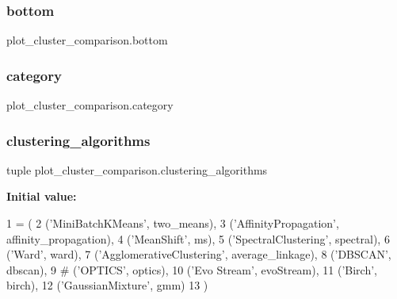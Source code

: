 \subsubsection{\texorpdfstring{bottom}{bottom}}
{\footnotesize\ttfamily plot\+\_\+cluster\+\_\+comparison.\+bottom}

\mbox{\label{namespaceplot__cluster__comparison_ab41605764644eb78915c2ce8dbc4bd89}} 
\subsubsection{\texorpdfstring{category}{category}}
{\footnotesize\ttfamily plot\+\_\+cluster\+\_\+comparison.\+category}

\mbox{\label{namespaceplot__cluster__comparison_a11980a91d1ed10bf862a103ff8f9990a}} 
\subsubsection{\texorpdfstring{clustering\+\_\+algorithms}{clustering\_algorithms}}
{\footnotesize\ttfamily tuple plot\+\_\+cluster\+\_\+comparison.\+clustering\+\_\+algorithms}

{\bfseries Initial value\+:}
\begin{DoxyCode}
1 =  (
2         (\textcolor{stringliteral}{'MiniBatchKMeans'}, two\_means),
3         (\textcolor{stringliteral}{'AffinityPropagation'}, affinity\_propagation),
4         (\textcolor{stringliteral}{'MeanShift'}, ms),
5         (\textcolor{stringliteral}{'SpectralClustering'}, spectral),
6         (\textcolor{stringliteral}{'Ward'}, ward),
7         (\textcolor{stringliteral}{'AgglomerativeClustering'}, average\_linkage),
8         (\textcolor{stringliteral}{'DBSCAN'}, dbscan),
9         \textcolor{comment}{# ('OPTICS', optics),}
10         (\textcolor{stringliteral}{'Evo Stream'}, evoStream),
11         (\textcolor{stringliteral}{'Birch'}, birch),
12         (\textcolor{stringliteral}{'GaussianMixture'}, gmm)
13     )
\end{DoxyCode}
\mbox{\label{namespaceplot__cluster__comparison_af240eda41b5ec0a14b679276ca981cd4}} 
